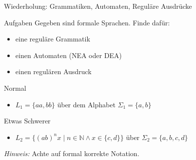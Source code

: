 
{
\begin{frame}{Wiederholung: Grammatiken, Automaten, Reguläre Ausdrücke}
    \begin{alertblock}{Aufgaben}
        Gegeben sind formale Sprachen. Finde dafür:
        \vspace{-0.3cm}
        \begin{itemize}
            \item eine reguläre Grammatik
            \item einen Automaten (NEA oder DEA)
            \item einen regulären Ausdruck
        \end{itemize}
    \end{alertblock}
    \begin{block}{Normal}
        \begin{itemize}
            \item $L_1 = \{aa, bb\}$ über dem Alphabet $\Sigma_1 = \{a, b\}$
        \end{itemize}
    \end{block}
    \begin{block}{Etwas Schwerer}
        \begin{itemize}
            \item $L_2 = \{(ab)^nx \mid n \in \mathbb{N} \land x \in \{c,d\}\}$ über $\Sigma_2 = \{a,b,c,d\}$
        \end{itemize}
    \end{block}
    \textit{Hinweis:} Achte auf formal korrekte Notation.
\end{frame}
}

